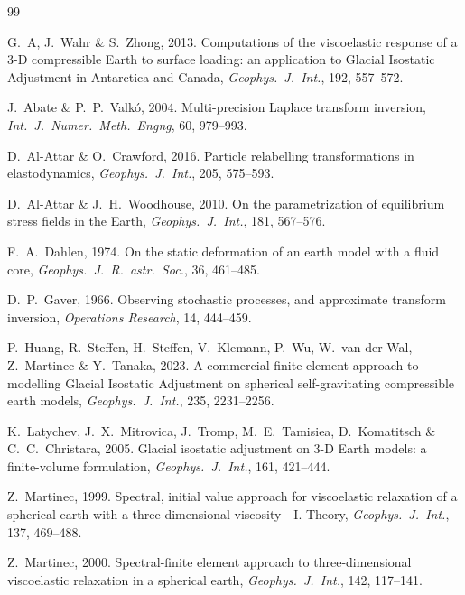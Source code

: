 \documentclass[11pt]{article}
\numberwithin{equation}{section}
\begin{document}
\begin{thebibliography}{99}

G.~A, J.~Wahr \& S.~Zhong, 2013.
Computations of the viscoelastic response of a 3-D compressible Earth to
surface loading: an application to Glacial Isostatic Adjustment in
Antarctica and Canada, \emph{Geophys.\ J.\ Int.}, 192, 557--572.

J.~Abate \& P.~P.~Valk\'o, 2004.
Multi-precision Laplace transform inversion,
\emph{Int.\ J.\ Numer.\ Meth.\ Engng}, 60, 979--993.

D.~Al-Attar \& O.~Crawford, 2016.
Particle relabelling transformations in elastodynamics,
\emph{Geophys.\ J.\ Int.}, 205, 575--593.

D.~Al-Attar \& J.~H.~Woodhouse, 2010.
On the parametrization of equilibrium stress fields in the Earth,
\emph{Geophys.\ J.\ Int.}, 181, 567--576.

F.~A.~Dahlen, 1974.
On the static deformation of an earth model with a fluid core,
\emph{Geophys.\ J.\ R.\ astr.\ Soc.}, 36, 461--485.

D.~P.~Gaver, 1966.
Observing stochastic processes, and approximate transform inversion,
\emph{Operations Research}, 14, 444--459.

P.~Huang, R.~Steffen, H.~Steffen, V.~Klemann, P.~Wu, W.~van der Wal,
Z.~Martinec \& Y.~Tanaka, 2023.
A commercial finite element approach to modelling Glacial Isostatic
Adjustment on spherical self-gravitating compressible earth models,
\emph{Geophys.\ J.\ Int.}, 235, 2231--2256.

K.~Latychev, J.~X.~Mitrovica, J.~Tromp, M.~E.~Tamisiea, D.~Komatitsch \&
C.~C.~Christara, 2005.
Glacial isostatic adjustment on 3-D Earth models: a finite-volume
formulation, \emph{Geophys.\ J.\ Int.}, 161, 421--444.

Z.~Martinec, 1999.
Spectral, initial value approach for viscoelastic relaxation of a
spherical earth with a three-dimensional viscosity---I. Theory,
\emph{Geophys.\ J.\ Int.}, 137, 469--488.

Z.~Martinec, 2000.
Spectral-finite element approach to three-dimensional viscoelastic
relaxation in a spherical earth, \emph{Geophys.\ J.\ Int.}, 142, 117--141.


\end{thebibliography}
\end{document}
